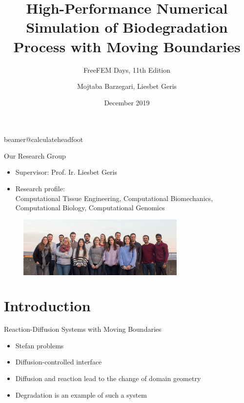 \documentclass[11pt,t]{beamer}
\title[]{High-Performance Numerical Simulation of Biodegradation Process with Moving Boundaries} %
\subtitle{FreeFEM Days, 11th Edition}
\author{Mojtaba Barzegari, Liesbet Geris}
\institute{Biomechanics Section, Department of Mechanical Engineering, KU Leuven}
\date{December 2019}
\begin{document}
\csname beamer@calculateheadfoot\endcsname %

\begin{frame}
	\titlepage
\end{frame}
	
%

\begin{frame}[fragile]{Our Research Group}  


\begin{itemize}
\item
Supervisor: Prof. Ir. Liesbet Geris
\item
Research profile:
\\
Computational Tissue Engineering, Computational Biomechanics, Computational Biology, Computational Genomics
\end{itemize}

	\begin{figure}
			\centering
			\includegraphics[width=0.74\textwidth]{team}
			 
	\end{figure}

\end{frame}


\section{Introduction}

\begin{frame}[fragile]{Reaction-Diffusion Systems with Moving Boundaries}  

\begin{itemize}
\item
Stefan problems
\item
Diffusion-controlled interface
\item
 Diffusion and reaction lead to the change of domain geometry
 \item 
 Degradation is an example of such a system
\end{itemize}

\end{frame}
\end{document}

